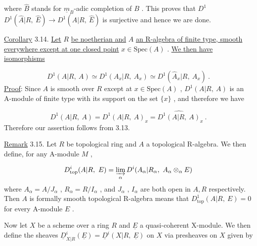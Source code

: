 \begin{center}
\end{center}
where  $\hat{B}$  stands for  $\underline{m}_B$-adic completion of  $B$  . This proves that  $D^1$
$D^1(\hat{A}|R,\ \hat{E}) \to D^1(A|R,\ \hat{E})$  is surjective and hence we are done.



\underline{Corollary} 3.14. \underline{Let}  $R$  \underline{be noetherian and}  $A$  \underline{an R-algebra of finite type, smooth everywhere except at one closed point}  $x \in \mathrm{Spec}(A)$  . \underline{We then have isomorphisms}

\begin{equation*}
D^1(A|R,\ A) \simeq D^1(A_x|R,\ A_x) \simeq D^1(\hat{A}_x|R,\ \hat{A}_x)\ .
\end{equation*}
\underline{Proof}: Since  $A$  is smooth over  $R$  except at  $x \in \mathrm{Spec}(A)$  ,  $D^1(A|R,\ A)$  is an A-module of finite type with its support on the set  $\{x\}$  , and therefore we have

\begin{equation*}
D^1(A|R,\ A) = D^1(A|R,\ A)_x = \widehat{D^1(A|R,\ A)}_x\ .
\end{equation*}
Therefore our assertion follows from 3.13.

\underline{Remark} 3.15.  Let  $R$  be topological ring and  $A$  a topological R-algebra. We then define, for any A-module  $M$  ,

\begin{equation*}
D^i_{\mathrm{top}}(A|R,\ E) = \varinjlim_{\alpha} D^i(A_\alpha|R_\alpha,\ A_\alpha \otimes_\alpha E)
\end{equation*}
where  $A_\alpha = A/J_\alpha$ , $R_\alpha = R/I_\alpha$  , and  $J_\alpha$ , $I_\alpha$  are both open in  $A, R$  respectively. Then  $A$  is formally smooth topological R-algebra means that  $D^1_{\mathrm{top}}(A|R,\ E) = 0$  for every A-module  $E$  .

        Now let  $X$  be a scheme over a ring  $R$  and  $\underline{E}$  a quasi-coherent  X-module. We then define the sheaves  $\underline{D}^i_{X|R}(\underline{E}) = \underline{D}^i(X|R,\ \underline{E})$  on  $X$  via presheaves on  $X$  given by

